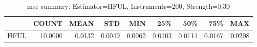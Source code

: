 \begin{table}[ht]
\centering
\caption{mse summary: Estimator=HFUL, Instruments=200, Strength=0.30}
\begin{tabular}{lrrrrrrrr}
\toprule
 & COUNT & MEAN & STD & MIN & 25\% & 50\% & 75\% & MAX \\
\midrule
HFUL & 10.0000 & 0.0132 & 0.0049 & 0.0062 & 0.0103 & 0.0114 & 0.0167 & 0.0208 \\
\bottomrule
\end{tabular}
\end{table}
